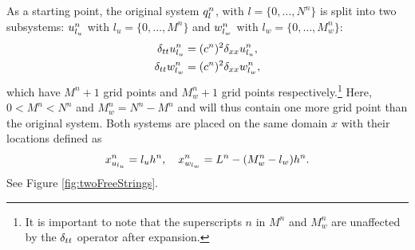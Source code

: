 \documentclass[fleqn]{jaes}
\begin{document}
As a starting point, the original system $q_l^n$, with $l=\{0, \hdots, N^n\}$ is split into two subsystems: $u_{l_u}^n$ with $l_u=\{0, \hdots, M^n\}$ and $w_{l_w}^n$ with  $l_w=\{0, \hdots, M_w^n\}$:
\begin{subequations}\label{eq:splitFDS}
    \begin{align}
        \delta_{tt} u_{l_u}^n &= (c^n)^2\delta_{xx} u_{l_u}^n,\\
        \delta_{tt} w_{l_w}^n &= (c^n)^2\delta_{xx} w_{l_w}^n,
    \end{align}
\end{subequations}
which have $M^n+1$ grid points and $M_w^n+1$ grid points respectively.\footnote{It is important to note that the superscripts $n$ in $M^n$ and $M_w^n$ are unaffected by the $\delta_{tt}$ operator after expansion.} Here, $0<M^n<N^n$ and $M_w^n = N^n - M^n$ and will thus contain one more grid point than the original system. Both systems are placed on the same domain $x$ with their locations defined as
\begin{equation}\label{eq:gridLocations}
    x_{u_\lu}^n =\lu h^n, \quad x_{w_\lw}^n = L^n-(M_w^n-\lw)h^n.
\end{equation}
See Figure \ref{fig:twoFreeStrings}.
\def\figwidth{0.99}
\end{document}
